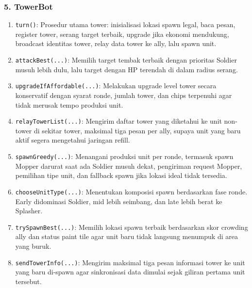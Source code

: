 \subsubsection{5. TowerBot}
\begin{enumerate}
	\item \texttt{turn()}:
	      Prosedur utama tower: inisialisasi lokasi spawn legal, baca pesan, register tower, serang target terbaik, upgrade jika ekonomi mendukung, broadcast identitas tower, relay data tower ke ally, lalu spawn unit.

	\item \texttt{attackBest(...)}:
	      Memilih target tembak terbaik dengan prioritas Soldier musuh lebih dulu, lalu target dengan HP terendah di dalam radius serang.

	\item \texttt{upgradeIfAffordable(...)}:
	      Melakukan upgrade level tower secara konservatif dengan syarat ronde, jumlah tower, dan chips terpenuhi agar tidak merusak tempo produksi unit.

	\item \texttt{relayTowerList(...)}:
	      Mengirim daftar tower yang diketahui ke unit non-tower di sekitar tower, maksimal tiga pesan per ally, supaya unit yang baru aktif segera mengetahui jaringan refill.

	\item \texttt{spawnGreedy(...)}:
	      Menangani produksi unit per ronde, termasuk spawn Mopper darurat saat ada Soldier musuh dekat, pengiriman request Mopper, pemilihan tipe unit, dan fallback spawn jika lokasi ideal tidak tersedia.

	\item \texttt{chooseUnitType(...)}:
	      Menentukan komposisi spawn berdasarkan fase ronde. Early didominasi Soldier, mid lebih seimbang, dan late lebih berat ke Splasher.

	\item \texttt{trySpawnBest(...)}:
	      Memilih lokasi spawn terbaik berdasarkan skor crowding ally dan status paint tile agar unit baru tidak langsung menumpuk di area yang buruk.

	\item \texttt{sendTowerInfo(...)}:
	      Mengirim maksimal tiga pesan informasi tower ke unit yang baru di-spawn agar sinkronisasi data dimulai sejak giliran pertama unit tersebut.
\end{enumerate}

